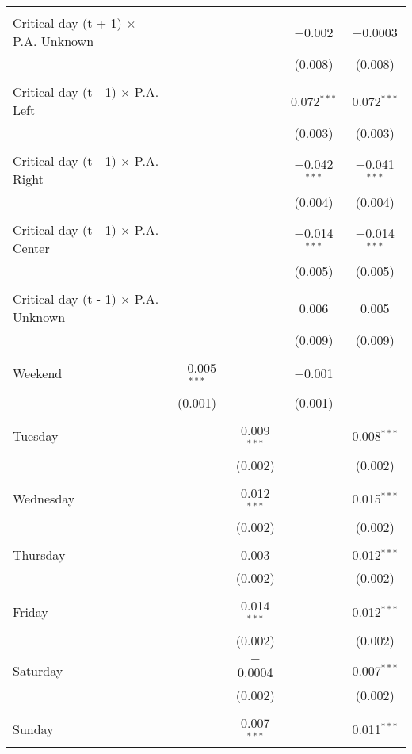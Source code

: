 \documentclass[
]{article}
\begin{document}
\begin{table}[!htbp]
{\begin{tabular}{@{\extracolsep{5pt}}lcccc}
  & & & & \\ 
 Critical day (t + 1) $\times$ P.A. Unknown &  &  & $-$0.002 & $-$0.0003 \\ 
  &  &  & (0.008) & (0.008) \\ 
  & & & & \\ 
 Critical day (t - 1) $\times$ P.A. Left &  &  & 0.072$^{***}$ & 0.072$^{***}$ \\ 
  &  &  & (0.003) & (0.003) \\ 
  & & & & \\ 
 Critical day (t - 1) $\times$ P.A. Right &  &  & $-$0.042$^{***}$ & $-$0.041$^{***}$ \\ 
  &  &  & (0.004) & (0.004) \\ 
  & & & & \\ 
 Critical day (t - 1) $\times$ P.A. Center &  &  & $-$0.014$^{***}$ & $-$0.014$^{***}$ \\ 
  &  &  & (0.005) & (0.005) \\ 
  & & & & \\ 
 Critical day (t - 1) $\times$ P.A. Unknown &  &  & 0.006 & 0.005 \\ 
  &  &  & (0.009) & (0.009) \\ 
  & & & & \\ 
 Weekend & $-$0.005$^{***}$ &  & $-$0.001 &  \\ 
  & (0.001) &  & (0.001) &  \\ 
  & & & & \\ 
 Tuesday &  & 0.009$^{***}$ &  & 0.008$^{***}$ \\ 
  &  & (0.002) &  & (0.002) \\ 
  & & & & \\ 
 Wednesday &  & 0.012$^{***}$ &  & 0.015$^{***}$ \\ 
  &  & (0.002) &  & (0.002) \\ 
  & & & & \\ 
 Thursday &  & 0.003 &  & 0.012$^{***}$ \\ 
  &  & (0.002) &  & (0.002) \\ 
  & & & & \\ 
 Friday &  & 0.014$^{***}$ &  & 0.012$^{***}$ \\ 
  &  & (0.002) &  & (0.002) \\ 
  & & & & \\ 
 Saturday &  & $-$0.0004 &  & 0.007$^{***}$ \\ 
  &  & (0.002) &  & (0.002) \\ 
  & & & & \\ 
 Sunday &  & 0.007$^{***}$ &  & 0.011$^{***}$ \\ 

\end{tabular}}
\end{table}
\end{document}
